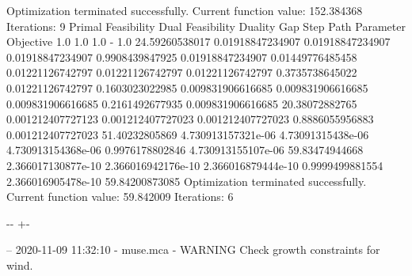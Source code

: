 \documentclass[letterpaper,10pt,english]{sphinxmanual}
\newlength\nbsphinxcodecellspacing
\begin{document}
{\begin{sphinxVerbatim}[commandchars=\\\{\}]
Optimization terminated successfully.
         Current function value: 152.384368
         Iterations: 9
Primal Feasibility  Dual Feasibility    Duality Gap         Step             Path Parameter      Objective
1.0                 1.0                 1.0                 -                1.0                 24.59260538017
0.01918847234907    0.01918847234907    0.01918847234907    0.9908439847925  0.01918847234907    0.01449776485458
0.01221126742797    0.01221126742797    0.01221126742797    0.3735738645022  0.01221126742797    0.1603023022985
0.009831906616685   0.009831906616685   0.009831906616685   0.2161492677935  0.009831906616685   20.38072882765
0.001212407727123   0.001212407727023   0.001212407727023   0.8886055956883  0.001212407727023   51.40232805869
4.730913157321e-06  4.73091315438e-06   4.730913154368e-06  0.9976178802846  4.730913155107e-06  59.83474944668
2.366017130877e-10  2.366016942176e-10  2.366016879444e-10  0.9999499881554  2.366016905478e-10  59.84200873085
Optimization terminated successfully.
         Current function value: 59.842009
         Iterations: 6
\end{sphinxVerbatim}
}

{

\kern-\sphinxverbatimsmallskipamount\kern-\baselineskip
\kern+\FrameHeightAdjust\kern-\fboxrule
\vspace{\nbsphinxcodecellspacing}

\begin{sphinxVerbatim}[commandchars=\\\{\}]
-- 2020-11-09 11:32:10 - muse.mca - WARNING
Check growth constraints for wind.

\end{sphinxVerbatim}
}
\end{document}

